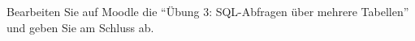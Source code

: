 
  \begin{mysubmission}
    Bearbeiten Sie auf Moodle die ``Übung 3: SQL-Abfragen über mehrere Tabellen'' und geben Sie am Schluss ab.
  \end{mysubmission}
  
  
   


